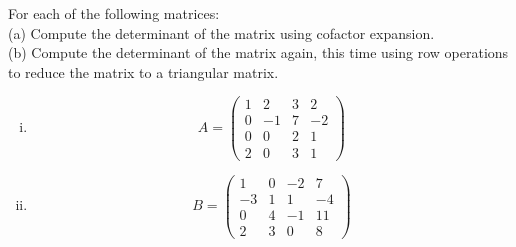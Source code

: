 \begin{question}
\normalfont
For each of the following matrices: \\
\noindent (a) Compute the determinant of the matrix using cofactor expansion. \\
\noindent (b) Compute the determinant of the matrix again, this time using row operations to reduce the matrix to a triangular matrix. \\
\begin{enumerate}[(i)]
\item
\[
A= \begin{pmatrix}
			1 & 2 & 3 & 2\\
			0 & -1 & 7 & -2\\
			0 & 0 & 2 & 1\\
			2 & 0 & 3 & 1	
		\end{pmatrix}
\]
\item
\[
B= \begin{pmatrix}
			1 & 0 & -2 & 7\\
			-3 & 1 & 1 & -4\\
			0 & 4 & -1 & 11\\
			2 & 3 & 0 & 8	
		\end{pmatrix}
\]

\end{enumerate}
\end{question}
